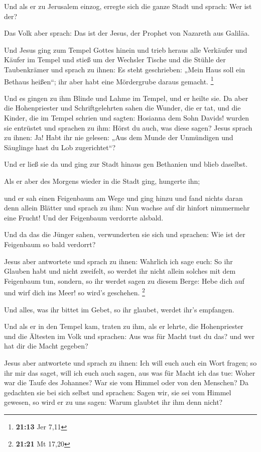  Und als er zu Jerusalem einzog, erregte sich die ganze
Stadt und sprach: Wer ist der?

 Das Volk aber sprach: Das ist der Jesus, der Prophet von
Nazareth aus Galiläa.

 Und Jesus ging zum Tempel Gottes hinein und trieb heraus
alle Verkäufer und Käufer im Tempel und stieß um der Wechsler Tische und
die Stühle der Taubenkrämer  und sprach zu ihnen: Es steht
geschrieben: „Mein Haus soll ein Bethaus heißen``; ihr aber habt eine
Mördergrube daraus gemacht. \footnote{\textbf{21:13} Jer 7,11}

 Und es gingen zu ihm Blinde und Lahme im Tempel, und er
heilte sie.  Da aber die Hohenpriester und Schriftgelehrten
sahen die Wunder, die er tat, und die Kinder, die im Tempel schrien und
sagten: Hosianna dem Sohn Davids! wurden sie entrüstet  und
sprachen zu ihm: Hörst du auch, was diese sagen? Jesus sprach zu ihnen:
Ja! Habt ihr nie gelesen: „Aus dem Munde der Unmündigen und Säuglinge
hast du Lob zugerichtet``?

 Und er ließ sie da und ging zur Stadt hinaus gen Bethanien
und blieb daselbst.

 Als er aber des Morgens wieder in die Stadt ging, hungerte
ihn;

 und er sah einen Feigenbaum am Wege und ging hinzu und
fand nichts daran denn allein Blätter und sprach zu ihm: Nun wachse auf
dir hinfort nimmermehr eine Frucht! Und der Feigenbaum verdorrte
alsbald.

 Und da das die Jünger sahen, verwunderten sie sich und
sprachen: Wie ist der Feigenbaum so bald verdorrt?

 Jesus aber antwortete und sprach zu ihnen: Wahrlich ich
sage euch: So ihr Glauben habt und nicht zweifelt, so werdet ihr nicht
allein solches mit dem Feigenbaum tun, sondern, so ihr werdet sagen zu
diesem Berge: Hebe dich auf und wirf dich ins Meer! so wird's geschehen.
\footnote{\textbf{21:21} Mt 17,20}

 Und alles, was ihr bittet im Gebet, so ihr glaubet, werdet
ihr's empfangen.

 Und als er in den Tempel kam, traten zu ihm, als er
lehrte, die Hohenpriester und die Ältesten im Volk und sprachen: Aus was
für Macht tust du das? und wer hat dir die Macht gegeben?

 Jesus aber antwortete und sprach zu ihnen: Ich will euch
auch ein Wort fragen; so ihr mir das saget, will ich euch auch sagen,
aus was für Macht ich das tue:  Woher war die Taufe des
Johannes? War sie vom Himmel oder von den Menschen? Da gedachten sie bei
sich selbst und sprachen: Sagen wir, sie sei vom Himmel gewesen, so wird
er zu uns sagen: Warum glaubtet ihr ihm denn nicht?

